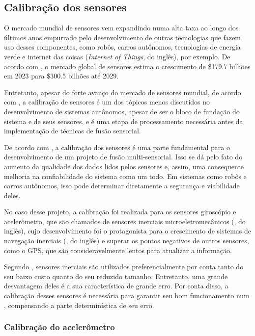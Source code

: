 \documentclass[acronym, symbols, table, deposito]{fei}
\begin{document}
		\subsection{Calibração dos sensores}\label{sec:calibracao_sensores}
		
		O mercado mundial de sensores vem expandindo numa alta taxa ao longo dos últimos anos empurrado pelo desenvolvimento de outras tecnologias que fazem uso desses componentes, como robôs, carros autônomos, tecnologias de energia verde e internet das coisas (\textit{Internet of Things}, do inglês), por exemplo. De acordo com \textcite{sensor_market}, o mercado global de sensores estima o crescimento de \$179.7 bilhões em 2023 para \$300.5 bilhões até 2029.
		
		Entretanto, apesar do forte avanço do mercado de sensores mundial, de acordo com \textcite{calibration_av}, a calibração de sensores é um dos tópicos menos discutidos no desenvolvimento de sistemas autônomos, apesar de ser o bloco de fundação do sistema e de seus sensores, e é uma etapa de processamento necessária antes da implementação de técnicas de fusão sensorial.
		
		De acordo com \textcite{lv2020targetless}, a calibração dos sensores é uma parte fundamental para o desenvolvimento de um projeto de fusão multi-sensorial. Isso se dá pelo fato do aumento da qualidade dos dados lidos pelos sensores e, assim, uma consequente melhoria na confiabilidade do sistema como um todo. Em sistemas como robôs e carros autônomos, isso pode determinar diretamente a segurança e viabilidade deles.
		
		No caso desse projeto, a calibração foi realizada para os sensores giroscópio e acelerômetro, que são chamados de sensores inerciais microeletromecânicos (, do inglês), cujo desenvolvimento foi o protagonista para o crescimento de sistemas de navegação inerciais (, do inglês) e superar os pontos negativos de outros sensores, como o GPS, que são consideravelmente lentos para atualizar a informação.
		
		Segundo \textcite{9181212}, sensores inerciais  são utilizados preferencialmente por conta tanto do seu baixo custo quanto do seu reduzido tamanho. Entretanto, uma grande desvantagem deles é a sua característica de grande erro. Por conta disso, a calibração desses sensores é necessária para garantir seu bom funcionamento num , compensando a parte determinística de seu erro.
		
			\subsubsection{Calibração do acelerômetro} \label{sec:calibracao_acelerometro}
			
\end{document}
